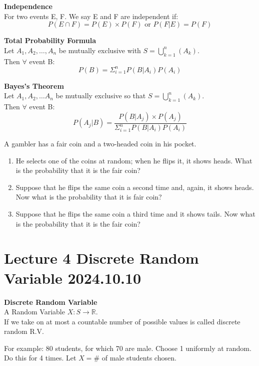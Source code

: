 \documentclass{article}
\begin{document}
\begin{definition}
    \textbf{Independence}\\
    For two events E, F. We say E and F are independent if:
    $$ P(E \cap F) = P(E)\times P(F) \text{ or } P(F|E) = P(F)$$
\end{definition}

\begin{theorem}
    \textbf{Total Probability Formula}\\
    Let $A_1,A_2,\dots,A_n$ be mutually exclusive with $S = \bigcup^n_{k=1}(A_k)$.\\
    Then $\forall$ event B:
    $$ P(B) = \Sigma^n_{i=1}P(B|A_i)P(A_i)$$
\end{theorem}

\begin{theorem}
    \textbf{Bayes's Theorem}\\
    Let $A_1,A_2,\dots A_n$ be mutually exclusive so that $S = \bigcup^n_{k=1}(A_k)$.\\
    Then $\forall$ event B:
    $$ P(A_j|B) = \frac{P(B|A_j)\times P(A_j)}{\Sigma^n_{i=1}P(B|A_i)P(A_i)}$$
\end{theorem}

\begin{quiz}
    A gambler has a fair coin and a two-headed coin in his pocket.
    \begin{enumerate}
        \item He selects one of the coins at random; when he flips it, it shows heads. What is the probability that it is the fair coin?
        \item Suppose that he flips the same coin a second time and, again, it shows heads. Now what is the probability that it is fair coin?
        \item Suppose that he flips the same coin a third time and it shows tails. Now what is the probability that it is the fair coin?
    \end{enumerate}
\end{quiz}




\section{Lecture 4 Discrete Random Variable 2024.10.10}

\begin{definition}
    \textbf{Discrete Random Variable}\\
    A Random Variable $ X: S \longrightarrow \mathbb{R}$.\\
    If we take on at most a countable number of possible values is called discrete random R.V.
\end{definition}
For example: 80 students, for which 70 are male. Choose 1 uniformly at random. Do this for 4 times. Let $X = \#$ of male students chosen.
\end{document}
